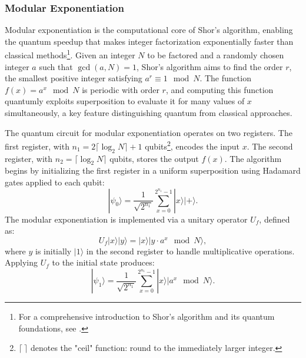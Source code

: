 \documentclass[conference,twoside]{IEEEtran}
\begin{document}
\subsubsection{Modular Exponentiation}
Modular exponentiation is the computational core of Shor's algorithm, enabling the quantum speedup that makes integer factorization exponentially faster than classical methods\footnote{For a comprehensive introduction to Shor’s algorithm and its quantum foundations, see \citep*{nielsen2010}.}. Given an integer \( N \) to be factored and a randomly chosen integer \( a \) such that \( \gcd(a, N) = 1 \), Shor's algorithm aims to find the order \( r \), the smallest positive integer satisfying \( a^r \equiv 1 \mod N \). The function \( f(x) = a^x \mod N \) is periodic with order \( r \), and computing this function quantumly exploits superposition to evaluate it for many values of \( x \) simultaneously, a key feature distinguishing quantum from classical approaches. 

The quantum circuit for modular exponentiation operates on two registers. The first register, with \( n_1 = 2 \lceil \log_2 N \rceil + 1 \) qubits\footnote{\(  \lceil \ \rceil\) denotes the "ceil" function: round to the immediately larger integer.}, encodes the input \( x \). The second register, with \( n_2 = \lceil \log_2 N \rceil \) qubits, stores the output \( f(x) \). The algorithm begins by initializing the first register in a uniform superposition using Hadamard gates applied to each qubit:
\begin{equation}
|\psi_0\rangle = \frac{1}{\sqrt{2^{n_1}}} \sum_{x=0}^{2^{n_1}-1} |x\rangle |+\rangle.
\end{equation}
The modular exponentiation is implemented via a unitary operator \( U_f \), defined as:
\begin{equation}
U_f |x\rangle |y\rangle = |x\rangle |y \cdot a^x \mod N\rangle,
\end{equation}
where \( y \) is initially \( |1\rangle \) in the second register to handle multiplicative operations. Applying \( U_f \) to the initial state produces:
\begin{equation}
|\psi_1\rangle = \frac{1}{\sqrt{2^{n_1}}} \sum_{x=0}^{2^{n_1}-1} |x\rangle |a^x \mod N\rangle.
\end{equation}
\end{document}
